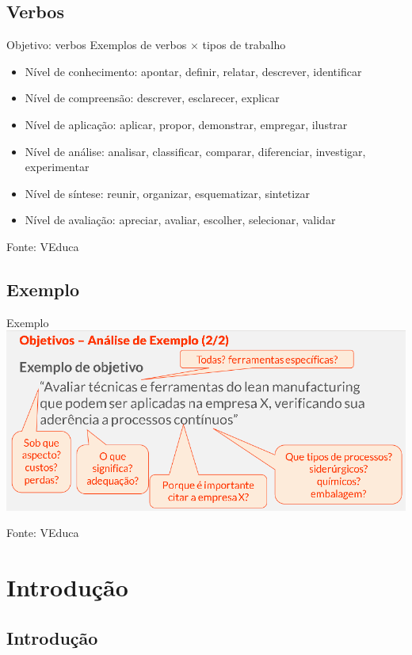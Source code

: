 \documentclass{beamer}
\begin{document}
\subsection{Verbos}

\begin{frame}{Objetivo: verbos}
  Exemplos de verbos $\times$ tipos de trabalho
  \begin{itemize}
  \item Nível de conhecimento: apontar, definir, relatar, descrever,
    identificar
  \item Nível de compreensão: descrever, esclarecer, explicar
  \item Nível de aplicação: aplicar, propor, demonstrar, empregar, ilustrar
  \item Nível de análise: analisar, classificar, comparar,
    diferenciar, investigar, experimentar
  \item Nível de síntese: reunir, organizar, esquematizar, sintetizar
  \item Nível de avaliação: apreciar, avaliar, escolher, selecionar, validar
  \end{itemize}

  Fonte: VEduca
\end{frame}

\subsection{Exemplo}

\begin{frame}{Exemplo}
  \includegraphics[width=1.15\textwidth]{ProjetoI/objetivo-verbos}

  Fonte: VEduca
\end{frame}

\section{Introdução}
\subsection{Introdução}
\end{document}
